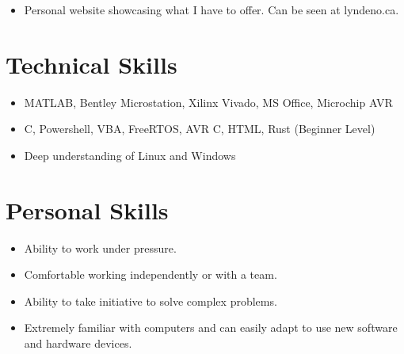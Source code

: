 \documentclass{lsanche_cv}
\begin{document}
\begin{multicols*}{2}
    \divider

      \begin{itemize}
        \item Personal website showcasing what I have to offer. Can be seen at lyndeno.ca.
      \end{itemize}
    
    \section{Technical Skills}
      \begin{itemize}
        \item MATLAB, Bentley Microstation, Xilinx Vivado, MS Office, Microchip AVR
        \item C, Powershell, VBA, FreeRTOS, AVR C, HTML, Rust (Beginner Level)
        \item Deep understanding of Linux and Windows
      \end{itemize}
    
    \section{Personal Skills}
      \begin{itemize}
        \item Ability to work under pressure.
        \item Comfortable working independently or with a team.
        \item Ability to take initiative to solve complex problems.
        \item Extremely familiar with computers and can easily adapt to use new software and hardware devices.
      \end{itemize}
\end{multicols*}
\end{document}
